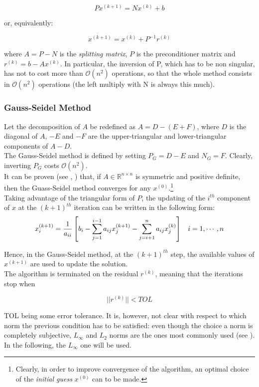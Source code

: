\documentclass{article}
\theoremstyle{theorem}
\theoremstyle{definition}
\begin{document}
$$Px^{(k+1)}=Nx^{(k)}+b$$

or, equivalently:

$$x^{(k+1)}=x^{(k)}+P^{-1}r^{(k)}$$

where $A=P-N$ is the \emph{splitting matrix}, $P$ is the preconditioner matrix and $r^{(k)}=b-Ax^{(k)}$. In particular, the inversion of
P, which has to be non singular, has not to cost more than $\mathcal{O}(n^2)$ operations, so that the whole method consists in $\mathcal{O}(n^2)$ operations  (the left multiply with N is always this much).\\

\subsubsection{Gauss-Seidel Method}
\label{subsubsec:gauss-seidel-method}
Let the decomposition of $A$ be redefined as $A=D-(E+F)$, where $D$ is the diagonal of $A$, $-E$ and $-F$ are the upper-triangular and lower-triangular components of $A-D$.\\
The Gauss-Seidel method is defined by setting $P_G=D-E$ and $N_G=F$. Clearly, inverting $P_G$ costs $\mathcal{O}(n^2)$.\\
It can be proven (see \cite{lec-notes}, \cite{hac94}) that, if $A\in\mathbb{R}^{n\times n}$ is symmetric and positive definite, then the Guass-Seidel method converges for any $x^{(0)}$.\footnote{Clearly, in order to improve convergence of the algorithm, an optimal choice of the \emph{initial guess} $x^{(0)}$ can to be made. }\\
Taking advantage of the triangular form of $P$, the updating of the $i^{th}$ component of $x$ at the $(k+1)^{th}$ iteration can be written in the following form:
\begin{equation}
	\label{eqn:Gauss-Seidel}
	x_i^{(k+1)}=\frac{1}{a_{ii}}\left[b_i-\sum_{j=1}^{i-1}a_{ij}x_j^{(k+1)}-\sum_{j=i+1}^{n}a_{ij}x_j^{(k)}\right]\hspace{3mm} i=1,\cdots, n
\end{equation}

Hence, in the Gauss-Seidel method, at the $(k+1)^{th}$ step, the available values of $x^{(k+1)}$ are used to update the solution.\\
The algorithm is terminated on the residual $r^{(k)}$, meaning that the iterations stop when

$$||r^{(k)}||<TOL$$

TOL being some error tolerance. It is, however, not clear with respect to which norm the previous condition has to be satisfied: even though the choice a norm is completely subjective, $L_\infty$ and $L_2$ norms are the ones most commonly used (see \cite{lec-notes}). In the following, the $L_\infty$ one will be used.\\
\end{document}
